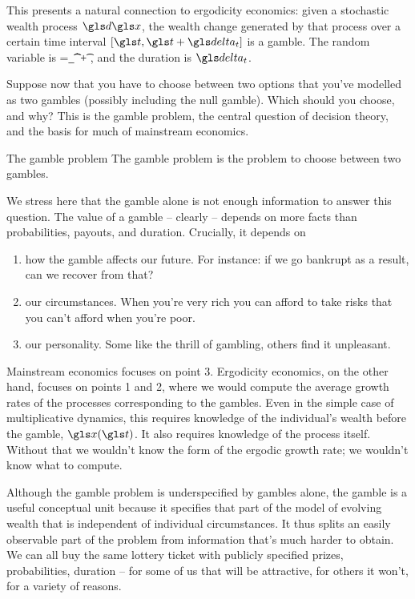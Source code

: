 This presents a natural connection to ergodicity economics: given a stochastic wealth 
process $\gd\x$, the wealth change generated by that process over a certain time 
interval $[\t,\t+\dt]$ is a gamble. The random variable is 
\be
\Q=\int_\t^{\t+\dt} \gd\x,
\ee and the duration is $\dt$.

Suppose now that you have to choose between two options that you've modelled 
as two gambles (possibly including the null gamble). Which should you choose, 
and why? This is the gamble problem, the central question of decision theory, and 
the basis for much of mainstream economics.

\begin{defn}{The gamble problem}
The gamble problem is the problem to choose between two gambles.
\end{defn}

We stress here that the gamble alone is not enough information to answer this question. 
The value of a gamble -- clearly -- depends on more facts than probabilities, payouts, and duration. Crucially, it depends on 
\begin{enumerate}
\item
how the gamble affects our future. For instance: if we go bankrupt as a result, can we recover from that?
\item
our circumstances. When you're very rich you can afford to take risks that you can't afford when you're poor. 
\item
our personality. Some like the thrill of gambling, others find it unpleasant.
\end{enumerate}
Mainstream economics focuses on point 3. Ergodicity economics, on the other hand, focuses on points 1 and 2, 
where we would compute the average growth rates of the processes corresponding to the gambles. 
Even in the simple case of multiplicative dynamics, this requires knowledge of the individual's wealth 
before the gamble, $\x(\t)$. It also requires knowledge of the process itself. Without that we wouldn't 
know the form of the ergodic growth rate; we wouldn't know what to compute. 

Although the gamble problem is underspecified by gambles alone, the gamble is a 
useful conceptual unit because it specifies that part of the model of evolving wealth 
that is independent of individual circumstances. It thus splits an easily observable part
of the problem from information that's much harder to obtain. We can all buy the same 
lottery ticket with publicly specified prizes, probabilities, duration -- for some of us that 
will be attractive, for others it won't, for a variety of reasons.


